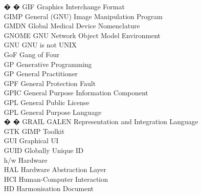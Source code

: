 \begin{tabbing}
� � \>GIF \>\>Graphics Interchange Format\\

    \>GIMP \>\>General (GNU) Image Manipulation Program\\

    \>GMDN \>\>Global Medical Device Nomenclature\\

    \>GNOME \>\>GNU Network Object Model Environment\\

    \>GNU \>\>GNU is not UNIX\\

    \>GoF \>\>Gang of Four\\

    \>GP \>\>Generative Programming\\

    \>GP \>\>General Practitioner\\

    \>GPF \>\>General Protection Fault\\

    \>GPIC \>\>General Purpose Information Component\\

    \>GPL \>\>General Public License\\

    \>GPL \>\>General Purpose Language\\


� � \>GRAIL \>\>GALEN Representation and Integration Language\\

    \>GTK \>\>GIMP Toolkit\\

    \>GUI \>\>Graphical UI\\

    \>GUID \>\>Globally Unique ID\\

    \>h/w \>\>Hardware\\

    \>HAL \>\>Hardware Abstraction Layer\\


    \>HCI \>\>Human-Computer Interaction\\

    \>HD \>\>Harmonisation Document\\


\end{tabbing}
